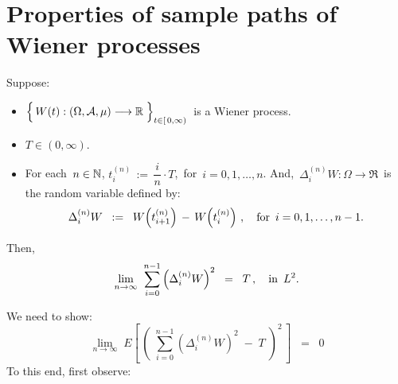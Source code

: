 

\section{Properties of sample paths of Wiener processes}
\setcounter{theorem}{0}
\setcounter{equation}{0}


\renewcommand{\theenumi}{\roman{enumi}}
\renewcommand{\labelenumi}{\textnormal{(\theenumi)}$\;\;$}


\begin{lemma}\label{lemmaLTwo}
\mbox{}
\vskip 0.2cm
\noindent
Suppose:
\begin{itemize}
\item
	$\left\{\,\overset{{\color{white}.}}{W}(t) : (\Omega,\mathcal{A},\mu) \longrightarrow \Re \;\right\}_{t \in[\,0,\infty)}$\,
	is a Wiener process.
\item
	$T\in (0,\infty)$.
\item
	For each \,$n \in \mathbb{N}$, \;$t^{(n)}_{i} \, := \, \dfrac{i}{n} \cdot T$,\, for \,$i = 0, 1, \ldots, n$.
	\vskip 0.1cm
	\noindent
	And, \,$\Delta^{(n)}_{i}W : \Omega \longrightarrow \Re$\, is the random variable defined by:
	\begin{equation*}
	\Delta^{(n)}_{i}W
	\;\; := \;\;
		W\!\left(t^{(n)}_{i+1}\right) \, - \, W\!\left(t^{(n)}_{i}\right)\,,
	\quad
	\textnormal{for \,$i = 0, 1, \ldots, n-1$}.
	\end{equation*}
\end{itemize}
Then,
\begin{equation*}
\underset{n \rightarrow \infty}{\lim}\;\;
\overset{n-1}{\underset{i=0}{\sum}}
\left(\Delta^{(n)}_{i}W\right)^{2}
\;\; = \;\;
	T\,,
\quad
\textnormal{in \,$L^{2}$}.
\end{equation*}
\end{lemma}
\proof
We need to show:
\begin{equation*}
\underset{n \rightarrow \infty}{\lim}\;
E\!\left[\,
	\left(\;\overset{n-1}{\underset{i=0}{\sum}} \left(\Delta^{(n)}_{i}W\right)^{2} \; - \; T\;\right)^{2}
	\,\right]
\;\; = \;\;
	0
\end{equation*}
To this end, first observe:
